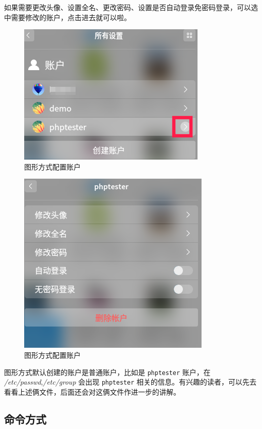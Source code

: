 \documentclass[doctor,openright,twoside]{sjtuthesis}
\newcommand{\passthrough}[1]{#1}
\theoremstyle{plain}
\theoremstyle{definition}
\theoremstyle{remark}
\theoremstyle{ocrenumbox}
\theoremstyle{plain}
\begin{document}
如果需要更改头像、设置全名、更改密码、设置是否自动登录免密码登录，可以选中需要修改的账户，点击进去就可以啦。

\begin{figure}
\centering
\includegraphics{images/manager-user-account-03.png}
\caption{图形方式配置账户}
\end{figure}

\begin{figure}
\centering
\includegraphics{images/manager-user-account-04.png}
\caption{图形方式配置账户}
\end{figure}

图形方式默认创建的账户是普通账户，比如是 \passthrough{\lstinline!phptester!} 账户，在 \emph{/etc/passwd},\emph{/etc/group} 会出现 \passthrough{\lstinline!phptester!} 相关的信息。有兴趣的读者，可以先去看看上述俩文件，后面还会对这俩文件作进一步的讲解。

\hypertarget{section-119}{%
\subsection{命令方式}\label{section-119}}
\end{document}
